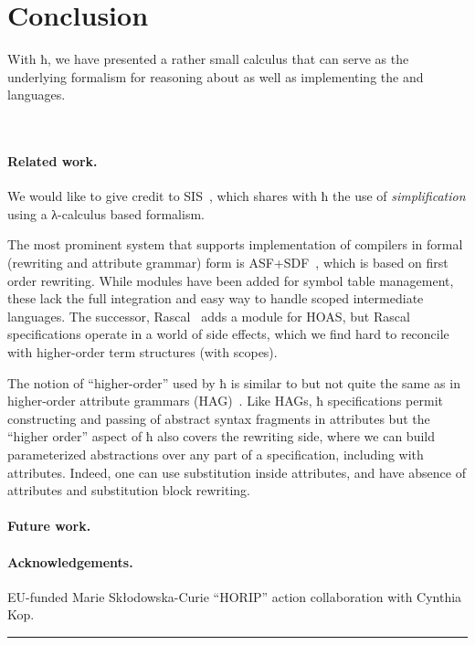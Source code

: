 \documentclass[letterpaper,10pt]{proc}
\begin{document}



\section{Conclusion}
\label{sec:conc}

With ħ, we have presented a rather small calculus that can serve as the underlying formalism for
reasoning about as well as implementing the \CRSX and \HAX languages.


~\cite{Knuth:mst1968} 
~\cite{Aho+:2006}


\paragraph*{Related work.}

We would like to give credit to SIS~\cite{Mosses:daimi1979}, which shares with ħ the use of
\emph{simplification} using a λ-calculus based formalism.

The most prominent system that supports implementation of compilers in formal (rewriting and
attribute grammar) form is ASF+SDF~\cite{Brand+:toplas2002}, which is based on first order
rewriting. While modules have been added for symbol table management, these lack the full
integration and easy way to handle scoped intermediate languages. The successor,
Rascal~\cite{Bos+:eptcs2011} adds a module for HOAS, but Rascal specifications operate in a world of
side effects, which we find hard to reconcile with higher-order term structures (with scopes).

The notion of ``higher-order'' used by ħ is similar to but not quite the same as in higher-order
attribute grammars (HAG)~\cite{VogtSwierstraKuiper:pldi1989}. Like HAGs, ħ specifications permit
constructing and passing of abstract syntax fragments in attributes but the ``higher order'' aspect
of ħ also covers the rewriting side, where we can build parameterized abstractions over any part
of a specification, including with attributes. Indeed, one can use substitution inside attributes,
and have absence of attributes and substitution block rewriting.

\paragraph*{Future work.} 


\paragraph*{Acknowledgements.} 

EU-funded Marie Skłodowska-Curie ``HORIP'' action collaboration with Cynthia Kop.






\hrule
\vspace*{1pc}
\end{document}
